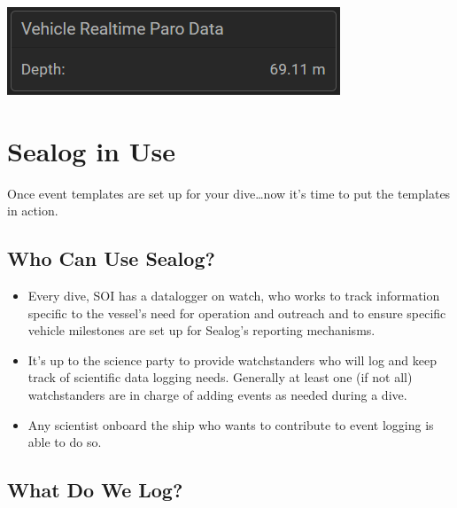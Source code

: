 \documentclass[
  letterpaper,
  DIV=11,
  numbers=noendperiod]{scrreprt}
\providecommand{\tightlist}{%
  \setlength{\itemsep}{0pt}\setlength{\parskip}{0pt}}\usepackage{longtable,booktabs,array}
\begin{document}
\includegraphics{images/image32.png}

\hypertarget{sealog-in-use}{%
\section{Sealog in Use}\label{sealog-in-use}}

Once event templates are set up for your dive\ldots now it's time to put
the templates in action.

\hypertarget{who-can-use-sealog}{%
\subsection{Who Can Use Sealog?}\label{who-can-use-sealog}}

\begin{itemize}
\tightlist
\item
  Every dive, SOI has a datalogger on watch, who works to track
  information specific to the vessel's need for operation and outreach
  and to ensure specific vehicle milestones are set up for Sealog's
  reporting mechanisms.
\item
  It's up to the science party to provide watchstanders who will log and
  keep track of scientific data logging needs. Generally at least one
  (if not all) watchstanders are in charge of adding events as needed
  during a dive.
\item
  Any scientist onboard the ship who wants to contribute to event
  logging is able to do so.
\end{itemize}

\hypertarget{what-do-we-log}{%
\subsection{What Do We Log?}\label{what-do-we-log}}
\end{document}
